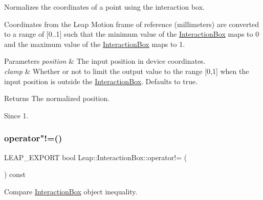 Normalizes the coordinates of a point using the interaction box.


\begin{DoxyCodeInclude}
\end{DoxyCodeInclude}


Coordinates from the Leap Motion frame of reference (millimeters) are converted to a range of \mbox{[}0..1\mbox{]} such that the minimum value of the \hyperlink{class_leap_1_1_interaction_box}{Interaction\+Box} maps to 0 and the maximum value of the \hyperlink{class_leap_1_1_interaction_box}{Interaction\+Box} maps to 1.


\begin{DoxyParams}{Parameters}
{\em position} & The input position in device coordinates. \\
\hline
{\em clamp} & Whether or not to limit the output value to the range \mbox{[}0,1\mbox{]} when the input position is outside the \hyperlink{class_leap_1_1_interaction_box}{Interaction\+Box}. Defaults to true. \\
\hline
\end{DoxyParams}
\begin{DoxyReturn}{Returns}
The normalized position. 
\end{DoxyReturn}
\begin{DoxySince}{Since}
1. 
\end{DoxySince}
\mbox{\label{class_leap_1_1_interaction_box_aaa512ca12a6c0f3326e9998787d31ef1}} 
\subsubsection{\texorpdfstring{operator"!=()}{operator!=()}}
{\footnotesize\ttfamily L\+E\+A\+P\+\_\+\+E\+X\+P\+O\+RT bool Leap\+::\+Interaction\+Box\+::operator!= (\begin{DoxyParamCaption}\item[{const \hyperlink{class_leap_1_1_interaction_box}{Interaction\+Box} \&}]{ }\end{DoxyParamCaption}) const}

Compare \hyperlink{class_leap_1_1_interaction_box}{Interaction\+Box} object inequality.


\begin{DoxyCodeInclude}
\end{DoxyCodeInclude}


